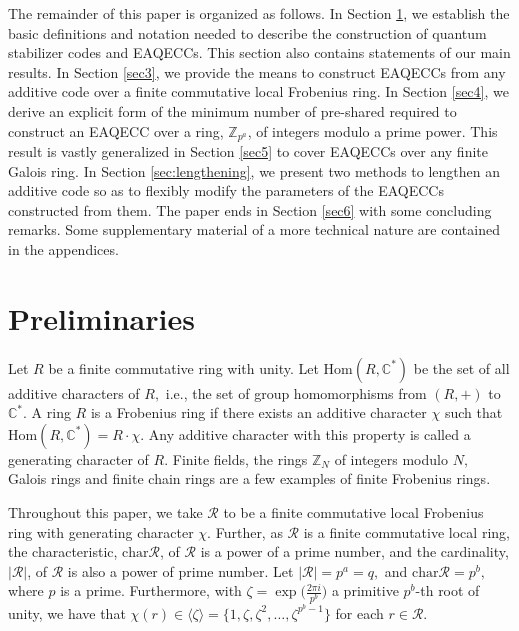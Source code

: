 \documentclass{article}
\def\Z{\mathbb{Z}}
\newtheorem{prop}{Proposition}[section]
\theoremstyle{remark}
\theoremstyle{definition}
\numberwithin{equation}{section}
\begin{document}
The remainder of this paper is organized as follows. In Section \ref{sec2}, we establish the basic definitions and notation needed to describe the construction of quantum stabilizer codes and EAQECCs. This section also contains statements of our main results.  In Section \ref{sec3}, we provide the means to construct EAQECCs from any additive code over a finite commutative local Frobenius ring. In Section \ref{sec4}, we derive an explicit form of the minimum number of pre-shared required to construct an EAQECC over a ring, $\Z_{p^a}$, of integers modulo a prime power. This result is vastly generalized in Section \ref{sec5} to cover EAQECCs over any finite Galois ring. In Section \ref{sec:lengthening}, we present two methods to lengthen an additive code so as to flexibly modify the parameters of the EAQECCs constructed from them. The paper ends in Section \ref{sec6} with some concluding remarks. Some supplementary material of a more technical nature are contained in the appendices.

\section{Preliminaries}\label{sec2}  Let $R$ be a finite commutative ring with unity. Let $\text{Hom}(R,\mathbb{C}^*)$ be the set of all additive characters of $R,$ i.e.,  the set of group homomorphisms from $(R,+)$ to $\mathbb{C}^*.$  A ring $R$ is a Frobenius ring if there exists an additive character $\chi$ such that  $\text{Hom}(R,\mathbb{C}^*)=R\cdot\chi.$ Any additive character with this property is called a generating character of $R.$ Finite fields, the rings $\mathbb{Z}_N$ of integers modulo $N,$ Galois rings and finite chain rings are a few examples of finite Frobenius rings.
%

Throughout this paper, we take $\mathcal{R}$ to be a finite commutative local Frobenius ring with generating character $\chi.$  Further, as $\mathcal{R}$ is a finite commutative local ring, the characteristic, $\text{char}{\mathcal R}$, of $\mathcal{R}$  is a power of a prime number, and the cardinality, $|\mathcal{R}|$, of $\mathcal{R}$ is also a power of prime number. Let  $|\mathcal{R}|=p^a=q,$ and $\text{char}{\mathcal R}=p^b,$ where $p$ is a prime.   Furthermore, with $\zeta = \exp\bigl(\frac{2 \pi i}{p^b}\bigr)$ a primitive $p^b$-th root of unity, we have that $\chi(r)\in \langle \zeta\rangle=\{1,\zeta,\zeta^2,\ldots,\zeta^{p^b-1}\}$ for each $r \in \mathcal{R}.$ 
 
\end{document}
